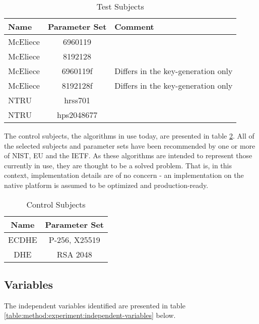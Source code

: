 
\begin{table}[H]
    \centering
    \begin{tabular}{l|c|p{4cm}}
        Name & Parameter Set & Comment \\
        \hline
        McEliece & 6960119 & \\
        McEliece & 8192128 & \\
        McEliece & 6960119f & Differs in the key-generation only \\
        McEliece & 8192128f & Differs in the key-generation only\\
        NTRU & hrss701 & \\
        NTRU & hps2048677 & \\
    \end{tabular}
    \caption{Test Subjects}
    \label{table:method:experiment:test-subjects}
\end{table}

The control subjects, the algorithms in use today, are presented in table \ref{table:method:experiment:control-subjects}. All of the selected subjects and parameter sets have been recommended by one or more of NIST, EU and the IETF. As these algorithms are intended to represent those currently in use, they are thought to be a solved problem. That is, in this context, implementation details are of no concern - an implementation on the native platform is assumed to be optimized and production-ready.

\begin{table}[H]
    \centering
    \begin{tabular}{c|c}
        Name & Parameter Set \\
        \hline
        ECDHE & P-256, X25519 \\
        DHE & RSA 2048 \\
    \end{tabular}
    \caption{Control Subjects}
    \label{table:method:experiment:control-subjects}
\end{table}

\subsection{Variables}

The independent variables identified are presented in table \ref{table:method:experiment:independent-variables} below.

